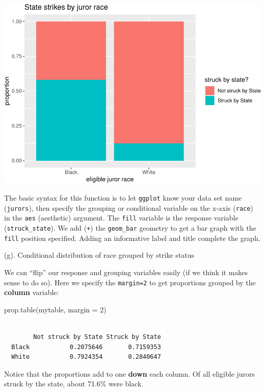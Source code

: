 \documentclass[
]{book}
\newenvironment{Shaded}{\begin{snugshade}}{\end{snugshade}}
\newcommand{\AttributeTok}[1]{\textcolor[rgb]{0.77,0.63,0.00}{#1}}
\newcommand{\DecValTok}[1]{\textcolor[rgb]{0.00,0.00,0.81}{#1}}
\newcommand{\FunctionTok}[1]{\textcolor[rgb]{0.00,0.00,0.00}{#1}}
\newcommand{\NormalTok}[1]{#1}
\begin{document}
\includegraphics[width=1\linewidth]{Class_Activity_4_files/figure-latex/unnamed-chunk-15-1}

The basic syntax for this function is to let \texttt{ggplot} know your data set name (\texttt{jurors}), then specify the grouping or conditional variable on the x-axis (\texttt{race}) in the \texttt{aes} (aesthetic) argument. The \texttt{fill} variable is the response variable (\texttt{struck\_state}). We add (\texttt{+}) the \texttt{geom\_bar} geometry to get a bar graph with the \texttt{fill} position specified. Adding an informative label and title complete the graph.

(g). Conditional distribution of race grouped by strike status

We can ``flip'' our response and grouping variables easily (if we think it makes sense to do so). Here we specify the \texttt{margin=2} to get proportions grouped by the \textbf{column} variable:

\begin{Shaded}
\begin{Highlighting}[]
\FunctionTok{prop.table}\NormalTok{(mytable, }\AttributeTok{margin =} \DecValTok{2}\NormalTok{)}
\end{Highlighting}
\end{Shaded}

\begin{verbatim}
       
        Not struck by State Struck by State
  Black           0.2075646       0.7159353
  White           0.7924354       0.2840647
\end{verbatim}

Notice that the proportions add to one \textbf{down} each column. Of all eligible jurors struck by the state, about 71.6\% were black.
\end{document}

